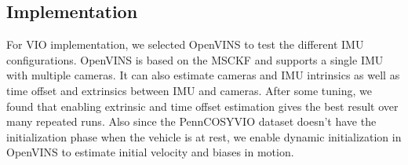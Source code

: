 \documentclass[conference]{IEEEtran}
\begin{document}
\subsection{Implementation}

For VIO implementation, we selected OpenVINS \cite{openvins} to test the different IMU configurations. OpenVINS is based on the MSCKF and supports a single IMU with multiple cameras. It can also estimate cameras and IMU intrinsics as well as time offset and extrinsics between IMU and cameras. After some tuning, we found that enabling extrinsic and time offset estimation gives the best result over many repeated runs. Also since the PennCOSYVIO dataset doesn't have the initialization phase when the vehicle is at rest, we enable dynamic initialization in OpenVINS to estimate initial velocity and biases in motion.
\end{document}
